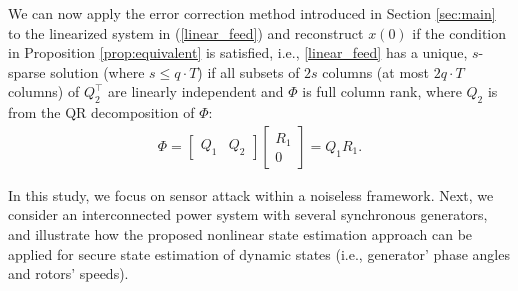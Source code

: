 We can now apply the error correction method introduced in Section \ref{sec:main} to the linearized system in (\ref{linear_feed}) and reconstruct $x(0)$ if the condition in Proposition \ref{prop:equivalent} is satisfied,
i.e., \eqref{linear_feed} has a unique, $s$-sparse solution (where $s\le q\cdot T$) if all subsets of $2s$ columns (at most $2 q\cdot T$ columns) of $Q_2^\top$ are linearly independent and $\Phi$ is full column rank, where $Q_2$ is from the QR decomposition of $\Phi$:
\begin{eqnarray}\nonumber
	\Phi = \begin{bmatrix} Q_1 & Q_2 \end{bmatrix} \begin{bmatrix} R_1 \\ 0 \end{bmatrix} = Q_1 R_1.
\end{eqnarray}





In this study, we focus on sensor attack within a noiseless framework. Next, we consider an interconnected power system with several synchronous generators, and illustrate how the proposed nonlinear state estimation approach can be applied for secure state estimation of dynamic states (i.e., generator' phase angles and rotors' speeds).


